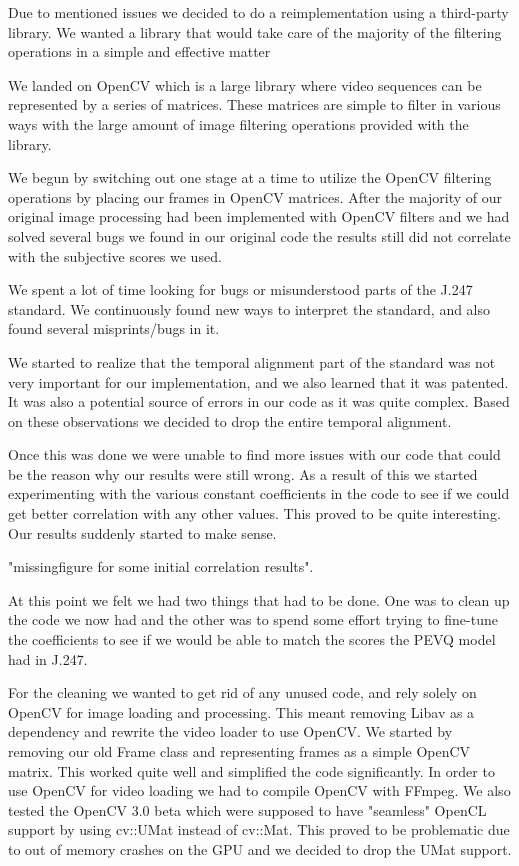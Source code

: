 Due to mentioned issues we decided to do a reimplementation using a third-party library. We wanted a library that would take care of the majority of the filtering operations in a simple and effective matter

We landed on OpenCV which is a large library where video sequences can be represented by a series of matrices. These matrices are simple to filter in various ways with the large amount of image filtering operations provided with the library.

We begun by switching out one stage at a time to utilize the OpenCV filtering operations by placing our frames in OpenCV matrices. After the majority of our original image processing had been implemented with OpenCV filters and we had solved several bugs we found in our original code the results still did not correlate with the subjective scores we used.

We spent a lot of time looking for bugs or misunderstood parts of the J.247 standard. We continuously found new ways to interpret the standard, and also found several misprints/bugs in it.

We started to realize that the temporal alignment part of the standard was not very important for our implementation, and we also learned that it was patented. It was also a potential source of errors in our code as it was quite complex. Based on these observations we decided to drop the entire temporal alignment. 

Once this was done we were unable to find more issues with our code that could be the reason why our results were still wrong. As a result of this we started experimenting with the various constant coefficients in the code to see if we could get better correlation with any other values. This proved to be quite interesting. Our results suddenly started to make sense.

"missingfigure for some initial correlation results".

At this point we felt we had two things that had to be done. One was to clean up the code we now had and the other was to spend some effort trying to fine-tune the coefficients to see if we would be able to match the scores the PEVQ model had in J.247.

For the cleaning we wanted to get rid of any unused code, and rely solely on OpenCV for image loading and processing. This meant removing Libav as a dependency and rewrite the video loader to use OpenCV. We started by removing our old Frame class and representing frames as a simple OpenCV matrix. This worked quite well and simplified the code significantly. In order to use OpenCV for video loading we had to compile OpenCV with FFmpeg. We also tested the OpenCV 3.0 beta which were supposed to have "seamless" OpenCL support by using cv::UMat instead of cv::Mat. This proved to be problematic due to out of memory crashes on the GPU and we decided to drop the UMat support.

